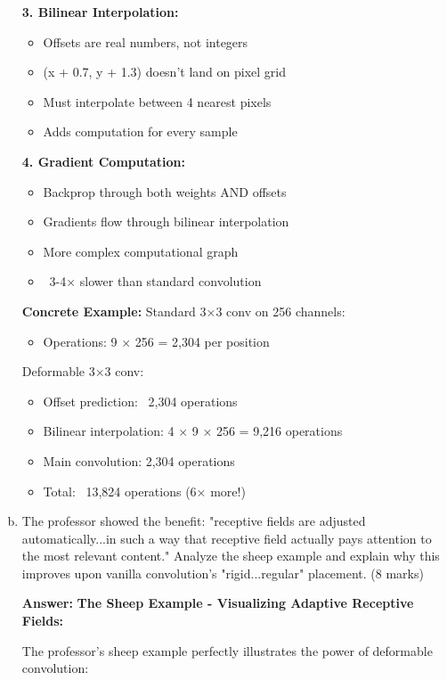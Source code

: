 \documentclass[12pt]{article}
\newcommand{\answer}[1]{{\color{answercolor}\textbf{Answer:} #1}}
\newcommand{\explanation}[1]{{\color{explanationcolor}#1}}
\begin{document}
\begin{enumerate}[(a)]
{{    \textbf{3. Bilinear Interpolation:}
    \begin{itemize}
        \item Offsets are real numbers, not integers
        \item (x + 0.7, y + 1.3) doesn't land on pixel grid
        \item Must interpolate between 4 nearest pixels
        \item Adds computation for every sample
    \end{itemize}
    
    \textbf{4. Gradient Computation:}
    \begin{itemize}
        \item Backprop through both weights AND offsets
        \item Gradients flow through bilinear interpolation
        \item More complex computational graph
        \item ~3-4× slower than standard convolution
    \end{itemize}
    
    \textbf{Concrete Example:}
    Standard 3×3 conv on 256 channels:
    \begin{itemize}
        \item Operations: 9 × 256 = 2,304 per position
    \end{itemize}
    
    Deformable 3×3 conv:
    \begin{itemize}
        \item Offset prediction: ~2,304 operations
        \item Bilinear interpolation: 4 × 9 × 256 = 9,216 operations
        \item Main convolution: 2,304 operations
        \item Total: ~13,824 operations (6× more!)
    \end{itemize}
    }
    }
    
    \item The professor showed the benefit: "receptive fields are adjusted automatically...in such a way that receptive field actually pays attention to the most relevant content." Analyze the sheep example and explain why this improves upon vanilla convolution's "rigid...regular" placement. \hfill (8 marks)
    
    \answer{
    \textbf{The Sheep Example - Visualizing Adaptive Receptive Fields:}
    
    \explanation{
    The professor's sheep example perfectly illustrates the power of deformable convolution:
    
}}
\end{enumerate}
\end{document}
